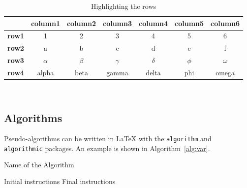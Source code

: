\documentclass{config/PoliMi3i_thesis}
\begin{document}
\begin{table}[H]
    \centering
    \begin{tabular}{|p{3em} c c c c c c|}
        \hline
                      & \textbf{column1} & \textbf{column2} & \textbf{column3} & \textbf{column4} & \textbf{column5} & \textbf{column6} \T\B \\
        \hline \hline
        \textbf{row1} & 1                & 2                & 3                & 4                & 5                & 6 \T\B                \\
        \hline
        \textbf{row2} & a                & b                & c                & d                & e                & f \T\B                \\
        \hline
        \textbf{row3} & $\alpha$         & $\beta$          & $\gamma$         & $\delta$         & $\phi$           & $\omega$ \T\B         \\
        \hline
        \textbf{row4} & alpha            & beta             & gamma            & delta            & phi              & omega \B              \\
        \hline
    \end{tabular}
    \\[10pt]
    \caption{Highlighting the rows}
    \label{table:exampleR}
\end{table}

\subsection{Algorithms}
\label{subsec:algorithms}

Pseudo-algorithms can be written in \LaTeX{} with the \texttt{algorithm} and \texttt{algorithmic} packages.
An example is shown in Algorithm~\ref{alg:var}.
\begin{algorithm}[H]
    \label{alg:example}
    \caption{Name of the Algorithm}
    \label{alg:var}
    \label{protocol1}
    \begin{algorithmic}[1]
        \STATE Initial instructions
        \ENDIF
        \ENDFOR
        \ENDWHILE
        \STATE Final instructions
    \end{algorithmic}
\end{algorithm}

\vspace{5mm}
\end{document}
